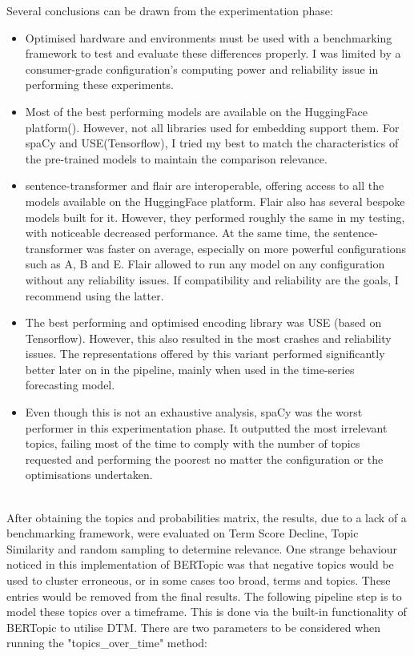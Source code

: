 \documentclass[12pt,MSc,a4paper,oneside]{muthesis}
\begin{document}
    Several conclusions can be drawn from the experimentation phase:

    \begin{itemize}
      \item Optimised hardware and environments must be used with a benchmarking framework to test and evaluate these differences properly. I was limited by a consumer-grade configuration's computing power and reliability issue in performing these experiments.
      \item Most of the best performing models are available on the HuggingFace platform(\cite{huggingface-models}). However, not all libraries used for embedding support them. For spaCy and USE(Tensorflow), I tried my best to match the characteristics of the pre-trained models to maintain the comparison relevance.
      \item  sentence-transformer and flair are interoperable, offering access to all the models available on the HuggingFace platform. Flair also has several bespoke models built for it. However, they performed roughly the same in my testing, with noticeable decreased performance. At the same time, the sentence-transformer was faster on average, especially on more powerful configurations such as A, B and E. Flair allowed to run any model on any configuration without any reliability issues. If compatibility and reliability are the goals, I recommend using the latter.
      \item The best performing and optimised encoding library was USE (based on Tensorflow). However, this also resulted in the most crashes and reliability issues. The representations offered by this variant performed significantly better later on in the pipeline, mainly when used in the time-series forecasting model.
      \item Even though this is not an exhaustive analysis, spaCy was the worst performer in this experimentation phase. It outputted the most irrelevant topics, failing most of the time to comply with the number of topics requested and performing the poorest no matter the configuration or the optimisations undertaken.
    \end{itemize}\\

    After obtaining the topics and probabilities matrix, the results, due to a lack of a benchmarking framework, were evaluated on Term Score Decline, Topic Similarity and random sampling to determine relevance.
    One strange behaviour noticed in this implementation of BERTopic was that negative topics would be used to cluster erroneous, or in some cases too broad, terms and topics. These entries would be removed from the final results.
    The following pipeline step is to model these topics over a timeframe. This is done via the built-in functionality of BERTopic to utilise DTM. There are two parameters to be considered when running the "topics\_over\_time" method:
\end{document}
